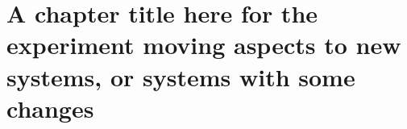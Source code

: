 \chapter{A chapter title here for the experiment moving aspects to new systems, or systems with some changes}